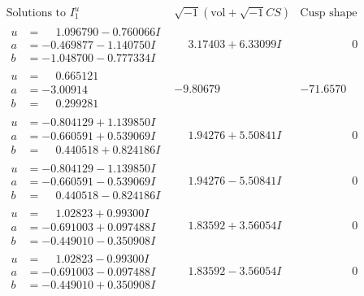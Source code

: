 \documentclass[1p]{elsarticle_modified}
\theoremstyle{definition}
\newcommand{\I}{\sqrt{-1}}
\begin{document}
$$\begin{array}{c|c|c}
\text{Solutions to }I^u_{1}& \I (\text{vol} + \sqrt{-1}CS) & \text{Cusp shape}\\
 \hline 
\begin{aligned}
u &= \phantom{-}1.096790 - 0.760066 I \\
a &= -0.469877 - 1.140750 I \\
b &= -1.048700 - 0.777334 I\end{aligned}
 & \phantom{-}3.17403 + 6.33099 I & \phantom{-0.000000 } 0 \\ \hline\begin{aligned}
u &= \phantom{-}0.665121\phantom{ +0.000000I} \\
a &= -3.00914\phantom{ +0.000000I} \\
b &= \phantom{-}0.299281\phantom{ +0.000000I}\end{aligned}
 & -9.80679\phantom{ +0.000000I} & -71.6570\phantom{ +0.000000I} \\ \hline\begin{aligned}
u &= -0.804129 + 1.139850 I \\
a &= -0.660591 + 0.539069 I \\
b &= \phantom{-}0.440518 + 0.824186 I\end{aligned}
 & \phantom{-}1.94276 + 5.50841 I & \phantom{-0.000000 } 0 \\ \hline\begin{aligned}
u &= -0.804129 - 1.139850 I \\
a &= -0.660591 - 0.539069 I \\
b &= \phantom{-}0.440518 - 0.824186 I\end{aligned}
 & \phantom{-}1.94276 - 5.50841 I & \phantom{-0.000000 } 0 \\ \hline\begin{aligned}
u &= \phantom{-}1.02823 + 0.99300 I \\
a &= -0.691003 + 0.097488 I \\
b &= -0.449010 - 0.350908 I\end{aligned}
 & \phantom{-}1.83592 + 3.56054 I & \phantom{-0.000000 } 0 \\ \hline\begin{aligned}
u &= \phantom{-}1.02823 - 0.99300 I \\
a &= -0.691003 - 0.097488 I \\
b &= -0.449010 + 0.350908 I\end{aligned}
 & \phantom{-}1.83592 - 3.56054 I & \phantom{-0.000000 } 0 \\ \hline\begin{aligned}

\end{aligned}
\end{array}$$
\end{document}
